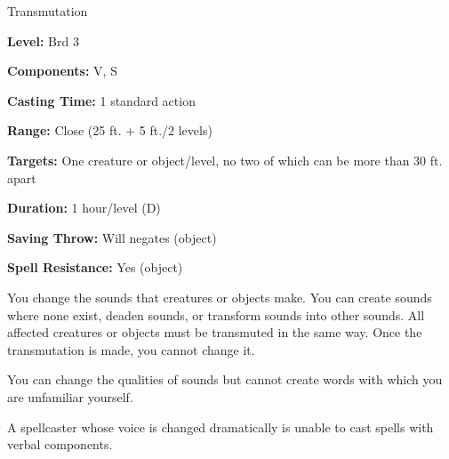 
Transmutation

\textbf{Level:} Brd 3

\textbf{Components:} V, S

\textbf{Casting Time:} 1 standard action

\textbf{Range:} Close (25 ft. + 5 ft./2 levels)

\textbf{Targets:} One creature or object/level, no two of which can be more than 
30 ft. apart

\textbf{Duration:} 1 hour/level (D)

\textbf{Saving Throw:} Will negates (object)

\textbf{Spell Resistance:} Yes (object)

You change the sounds that creatures or objects make. You can create sounds where 
none exist, deaden sounds, or transform sounds into other sounds. All affected 
creatures or objects must be transmuted in the same way. Once the transmutation 
is made, you cannot change it.

You can change the qualities of sounds but cannot create words with which you are 
unfamiliar yourself.

A spellcaster whose voice is changed dramatically is unable to cast spells with 
verbal components.

